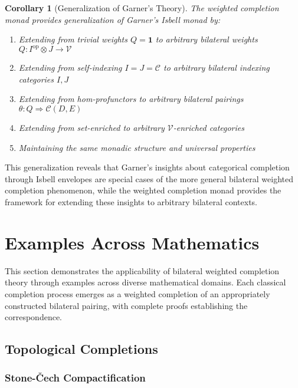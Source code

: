 \documentclass[11pt]{article}
\theoremstyle{plain}
\newtheorem{corollary}[theorem]{Corollary}
\theoremstyle{definition}
\theoremstyle{remark}
\newcommand{\V}{\mathcal{V}}
\newcommand{\C}{\mathcal{C}}
\newcommand{\op}{\mathrm{op}}
\begin{document}
\begin{corollary}[Generalization of Garner's Theory]\label{cor:garner-generalization}
The weighted completion monad provides generalization of Garner's Isbell monad by:
\begin{enumerate}
\item Extending from trivial weights $Q = \mathbf{1}$ to arbitrary bilateral weights $Q : I^{\op} \otimes J \to \V$
\item Extending from self-indexing $I = J = \C$ to arbitrary bilateral indexing categories $I, J$
\item Extending from hom-profunctors to arbitrary bilateral pairings $\theta : Q \Rightarrow \C(D, E)$
\item Extending from set-enriched to arbitrary $\V$-enriched categories
\item Maintaining the same monadic structure and universal properties
\end{enumerate}
\end{corollary}

This generalization reveals that Garner's insights about categorical completion through Isbell envelopes are special cases of the more general bilateral weighted completion phenomenon, while the weighted completion monad provides the framework for extending these insights to arbitrary bilateral contexts.

\section{Examples Across Mathematics}

This section demonstrates the applicability of bilateral weighted completion theory through examples across diverse mathematical domains. Each classical completion process emerges as a weighted completion of an appropriately constructed bilateral pairing, with complete proofs establishing the correspondence.

\subsection{Topological Completions}

\subsubsection{Stone-\v{C}ech Compactification}
\end{document}
